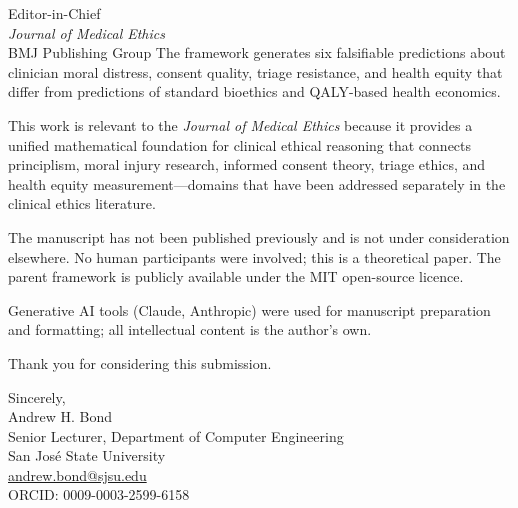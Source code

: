 \documentclass[12pt]{letter}
\begin{document}
\begin{letter}{%
Editor-in-Chief\\
\emph{Journal of Medical Ethics}\\
BMJ Publishing Group}
The framework generates six falsifiable predictions about clinician moral distress, consent quality, triage resistance, and health equity that differ from predictions of standard bioethics and QALY-based health economics.

This work is relevant to the \emph{Journal of Medical Ethics} because it provides a unified mathematical foundation for clinical ethical reasoning that connects principlism, moral injury research, informed consent theory, triage ethics, and health equity measurement---domains that have been addressed separately in the clinical ethics literature.

The manuscript has not been published previously and is not under consideration elsewhere.  No human participants were involved; this is a theoretical paper.  The parent framework is publicly available under the MIT open-source licence.

Generative AI tools (Claude, Anthropic) were used for manuscript preparation and formatting; all intellectual content is the author's own.

Thank you for considering this submission.

\closing{Sincerely,\\[2em]
Andrew H. Bond\\
Senior Lecturer, Department of Computer Engineering\\
San Jos\'{e} State University\\
\href{mailto:andrew.bond@sjsu.edu}{andrew.bond@sjsu.edu}\\
ORCID: 0009-0003-2599-6158}

\end{letter}
\end{document}
